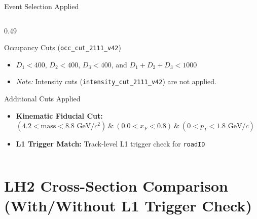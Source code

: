 \documentclass[aspectratio=169, 10pt]{beamer}
\begin{document}
\begin{frame}{Event Selection Applied}
\begin{columns}[T, onlytextwidth]
\begin{column}{0.49\textwidth}
        \begin{block}{\scriptsize Occupancy Cuts (\texttt{occ\_cut\_2111\_v42})}
            \tiny
            \begin{itemize}
                \item $D_1 < 400$, $D_2 < 400$, $D_3 < 400$, and $D_1 + D_2 + D_3 < 1000$
                \item \textit{Note:} Intensity cuts (\texttt{intensity\_cut\_2111\_v42}) are not applied.
            \end{itemize}
        \end{block}

        \begin{alertblock}{\scriptsize Additional Cuts Applied}
            \tiny
            \begin{itemize}
                \item \textbf{Kinematic Fiducial Cut:} $(4.2 < \text{mass} < 8.8\text{ GeV}/c^2) \ \& \ (0.0 < x_F < 0.8) \ \& \ (0 < p_T < 1.8\text{ GeV}/c)$
                \item \textbf{L1 Trigger Match:} Track-level L1 trigger check for \texttt{roadID}
            \end{itemize}
        \end{alertblock}
    \end{column}
\end{columns}
\normalsize
\end{frame}

\section{LH2 Cross-Section Comparison (With/Without L1 Trigger Check)}
\end{document}

